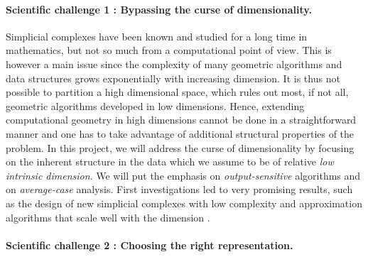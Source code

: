\vspace{-3mm}


\paragraph{Scientific challenge 1 :  Bypassing the curse of dimensionality.} 
Simplicial complexes have been known and studied for a long time in mathematics, but not so much from a computational point of view. This is however a main issue since the complexity of many geometric algorithms and data structures grows exponentially with increasing dimension. It is thus not possible to partition a high dimensional space, which rules out most, if not all, geometric algorithms developed in low dimensions.
Hence, extending computational geometry in high dimensions cannot be done in a straightforward manner and one has to take advantage of additional structural properties of the problem. %
In this project, we will address the curse of dimensionality by focusing on the inherent structure in the data which we assume to be of relative {\em low intrinsic dimension}.  We will put the emphasis on {\em output-sensitive} algorithms and on {\em average-case} analysis.  First investigations led to very promising results, such as the design of new simplicial complexes with low complexity and approximation algorithms that scale well with the dimension \cite{geometrica-7142i}.
\vspace{-3mm}

\paragraph{Scientific challenge 2 :  Choosing the right representation.}


